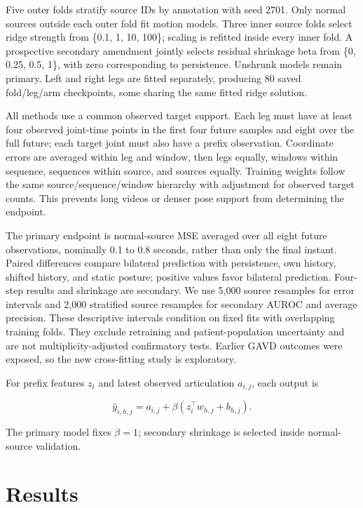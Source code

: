 \documentclass[letterpaper]{article}
\begin{document}
Five outer folds stratify source IDs by annotation with seed 2701. Only normal sources outside each outer fold fit motion models. Three inner source folds select ridge strength from \{0.1, 1, 10, 100\}; scaling is refitted inside every inner fold. A prospective secondary amendment jointly selects residual shrinkage beta from \{0, 0.25, 0.5, 1\}, with zero corresponding to persistence. Unshrunk models remain primary. Left and right legs are fitted separately, producing 80 saved fold/leg/arm checkpoints, some sharing the same fitted ridge solution.

All methods use a common observed target support. Each leg must have at least four observed joint-time points in the first four future samples and eight over the full future; each target joint must also have a prefix observation. Coordinate errors are averaged within leg and window, then legs equally, windows within sequence, sequences within source, and sources equally. Training weights follow the same source/sequence/window hierarchy with adjustment for observed target counts. This prevents long videos or denser pose support from determining the endpoint.

The primary endpoint is normal-source MSE averaged over all eight future observations, nominally 0.1 to 0.8 seconds, rather than only the final instant. Paired differences compare bilateral prediction with persistence, own history, shifted history, and static posture; positive values favor bilateral prediction. Four-step results and shrinkage are secondary. We use 5,000 source resamples for error intervals and 2,000 stratified source resamples for secondary AUROC and average precision. These descriptive intervals condition on fixed fits with overlapping training folds. They exclude retraining and patient-population uncertainty and are not multiplicity-adjusted confirmatory tests. Earlier GAVD outcomes were exposed, so the new cross-fitting study is exploratory.

For prefix features $z_i$ and latest observed articulation $a_{i,j}$, each output is

\begin{equation}\widehat y_{i,h,j}=a_{i,j}+\beta(z_i^\top w_{h,j}+b_{h,j}).\end{equation}

The primary model fixes $\beta=1$; secondary shrinkage is selected inside normal-source validation.

\section{Results}
\end{document}
